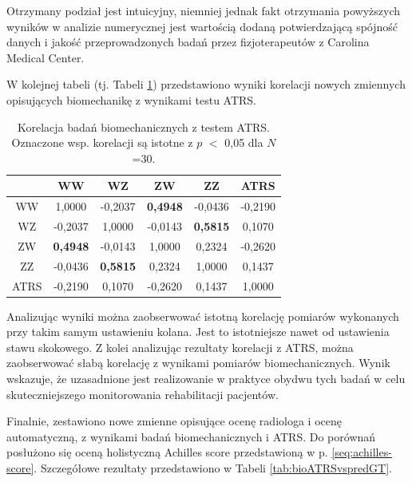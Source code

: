 Otrzymany podział jest intuicyjny, niemniej jednak fakt otrzymania powyższych wyników w analizie numerycznej jest wartością dodaną potwierdzającą spójność danych i jakość przeprowadzonych badań przez fizjoterapeutów z Carolina Medical Center.  

W kolejnej tabeli (tj. Tabeli \ref{tab:bioVSatrs}) przedstawiono wyniki korelacji nowych zmiennych opisujących biomechanikę z wynikami testu ATRS.
\vspace{10px}
\begin{table}[h]
	\centering
	\setlength{\tabcolsep}{3pt}
	\setlength\extrarowheight{2pt}
	\caption{Korelacja badań biomechanicznych z testem ATRS. Oznaczone wsp. korelacji są istotne z $p$ $<$ 0,05 dla $N$=30.}
	\label{tab:bioVSatrs}
	\begin{tabular}{c|c|c|c|c|c}
		&WW&WZ&ZW&ZZ&ATRS \\
		\hline \hline
		WW&1,0000&-0,2037&\textbf{0,4948}&-0,0436&-0,2190\\
		\hline
		WZ&-0,2037&1,0000&-0,0143&\textbf{0,5815}&0,1070\\
		\hline
		ZW&\textbf{0,4948}&-0,0143&1,0000&0,2324&-0,2620\\
		\hline
		ZZ&-0,0436&\textbf{0,5815}&0,2324&1,0000&0,1437\\
		\hline
		ATRS&-0,2190&0,1070&-0,2620&0,1437&1,0000\\
		
		
	\end{tabular}
\end{table}
\vspace{-10px}

Analizując wyniki można zaobserwować istotną korelację pomiarów wykonanych przy takim samym ustawieniu kolana. Jest to istotniejsze nawet od ustawienia stawu skokowego. Z kolei analizując rezultaty korelacji z ATRS, można zaobserwować słabą korelację z wynikami pomiarów biomechanicznych. Wynik wskazuje, że uzasadnione jest realizowanie w praktyce obydwu tych badań w celu skuteczniejszego monitorowania rehabilitacji pacjentów.

Finalnie, zestawiono nowe zmienne opisujące ocenę radiologa i ocenę automatyczną, z wynikami badań biomechanicznych i ATRS. Do porównań posłużono się oceną holistyczną Achilles score przedstawioną w p. \ref{seq:achilles-score}. Szczegółowe rezultaty przedstawiono w Tabeli \ref{tab:bioATRSvspredGT}.


